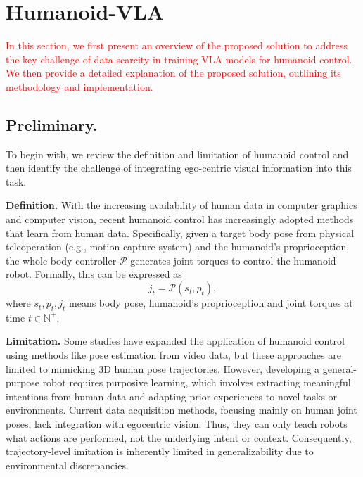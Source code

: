 \section{Humanoid-VLA}








\textcolor{red}{In this section, we first present an overview of the proposed solution to address the key challenge of data scarcity in training VLA models for humanoid control.
We then provide a detailed explanation of the proposed solution, outlining its methodology and implementation.}


\subsection{Preliminary. } 

To begin with, we review the definition and limitation of humanoid control and then identify the challenge of integrating ego-centric visual information into this task.

\textbf{Definition. }
With the increasing availability of human data in computer graphics and computer vision, recent humanoid control has increasingly adopted methods that learn from human data. 
Specifically, given a target body pose from physical teleoperation (e.g., motion capture system) and the humanoid's proprioception, the whole body controller $\mathcal{P}$ generates joint torques to control the humanoid robot. Formally, this can be expressed as
\begin{equation}
    j_t = \mathcal{P}(s_t, p_t),
\end{equation}
where $s_t, p_t, j_t$ means body
pose, humanoid's proprioception and joint torques at time $t\in \mathbb{N}^+$. 

\textbf{Limitation. } 
Some studies have expanded the application of humanoid control using methods like pose estimation from video data, but these approaches are limited to mimicking 3D human pose trajectories. However, developing a general-purpose robot requires purposive learning, which involves extracting meaningful intentions from human data and adapting prior experiences to novel tasks or environments. Current data acquisition methods, focusing mainly on human joint poses, lack integration with egocentric vision. Thus, they can only teach robots what actions are performed, not the underlying intent or context. Consequently, trajectory-level imitation is inherently limited in generalizability due to environmental discrepancies.

